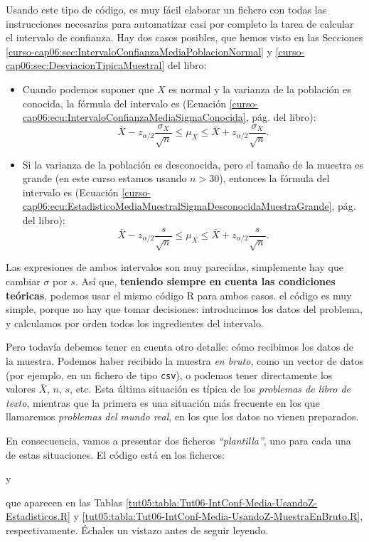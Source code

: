 \documentclass[10pt,a4paper]{article}\usepackage[]{graphicx}\usepackage[]{color}
\begin{document}
Usando este tipo de código, es muy fácil elaborar un fichero con todas las instrucciones necesarias para automatizar casi por completo la tarea de calcular el intervalo de confianza. Hay dos casos posibles, que hemos visto en las Secciones \ref{curso-cap06:sec:IntervaloConfianzaMediaPoblacionNormal} y \ref{curso-cap06:sec:DesviacionTipicaMuestral} del libro:
\begin{itemize}
  \item Cuando podemos suponer que $X$ es normal y la varianza de la población es conocida, la fórmula del intervalo es (Ecuación \ref{curso-cap06:ecu:IntervaloConfianzaMediaSigmaConocida}, pág. \pageref{curso-cap06:ecu:IntervaloConfianzaMediaSigmaConocida} del libro):
      \[
        \bar X-z_{\alpha/2}\dfrac{\sigma_X}{\sqrt{n}}\leq \mu_X \leq \bar X+z_{\alpha/2}\dfrac{\sigma_X}{\sqrt{n}}.
      \]

  \item Si la varianza de la población es desconocida, pero el tamaño de la muestra es grande (en
      este curso estamos usando $n>30$), entonces la fórmula del intervalo es (Ecuación
      \ref{curso-cap06:ecu:EstadisticoMediaMuestralSigmaDesconocidaMuestraGrande}, pág.
      \pageref{curso-cap06:ecu:IntervaloConfianzaMediaMuestraGrande} del libro):
       \[
       \bar X-z_{\alpha/2}\dfrac{s}{\sqrt{n}}\leq \mu_X \leq \bar X+z_{\alpha/2}\dfrac{s}{\sqrt{n}}.
       \]

\end{itemize}
Las expresiones de ambos intervalos son muy parecidas, simplemente hay que cambiar $\sigma$ por $s$. Así que, {\bf teniendo siempre en cuenta las condiciones teóricas}, podemos usar el mismo código R para ambos casos. el código es muy simple, porque no hay que tomar decisiones: introducimos los datos del problema, y calculamos por orden todos los ingredientes del intervalo.

Pero todavía debemos tener en cuenta otro detalle: cómo recibimos los datos de la muestra. Podemos haber recibido la muestra {\em en bruto}, como un vector de datos (por ejemplo, en un fichero de tipo {\tt csv}), o podemos tener directamente los valores $\bar X$, $n$, $s$, etc. Esta última situación es típica de los {\em problemas de libro de texto}, mientras que la primera es una situación más frecuente en los que llamaremos {\em problemas del mundo real}, en los que los datos no vienen preparados.

En consecuencia, vamos a presentar dos ficheros {\em ``plantilla''}, uno para cada una de estas situaciones. El código está en los ficheros:
\begin{center}
\end{center}
y
\begin{center}
\end{center}
que aparecen en las Tablas \ref{tut05:tabla:Tut06-IntConf-Media-UsandoZ-Estadisticos.R} y \ref{tut05:tabla:Tut06-IntConf-Media-UsandoZ-MuestraEnBruto.R}, respectivamente. Échales un vistazo antes de seguir leyendo.
\end{document}
